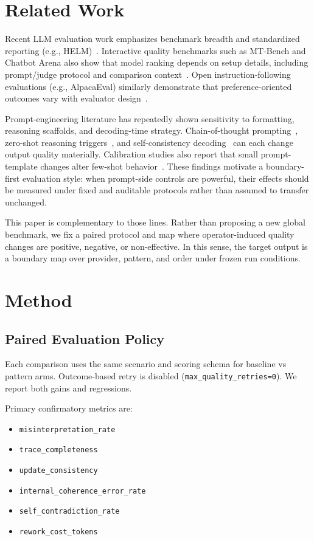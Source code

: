 \documentclass[11pt,a4paper]{article}
\begin{document}
\section{Related Work}
\label{sec:related}

Recent LLM evaluation work emphasizes benchmark breadth and standardized reporting (e.g., HELM)~\cite{liang2022helm}. Interactive quality benchmarks such as MT-Bench and Chatbot Arena also show that model ranking depends on setup details, including prompt/judge protocol and comparison context~\cite{zheng2023mtbench}. Open instruction-following evaluations (e.g., AlpacaEval) similarly demonstrate that preference-oriented outcomes vary with evaluator design~\cite{dubois2024alpacaeval}.

Prompt-engineering literature has repeatedly shown sensitivity to formatting, reasoning scaffolds, and decoding-time strategy. Chain-of-thought prompting~\cite{wei2022cot}, zero-shot reasoning triggers~\cite{kojima2022zeroshot}, and self-consistency decoding~\cite{wang2023selfconsistency} can each change output quality materially. Calibration studies also report that small prompt-template changes alter few-shot behavior~\cite{zhao2021calibrate}. These findings motivate a boundary-first evaluation style: when prompt-side controls are powerful, their effects should be measured under fixed and auditable protocols rather than assumed to transfer unchanged.

This paper is complementary to those lines. Rather than proposing a new global benchmark, we fix a paired protocol and map where operator-induced quality changes are positive, negative, or non-effective. In this sense, the target output is a boundary map over provider, pattern, and order under frozen run conditions.

\section{Method}
\label{sec:method}

\subsection{Paired Evaluation Policy}

Each comparison uses the same scenario and scoring schema for baseline vs pattern arms. Outcome-based retry is disabled (\texttt{max\_quality\_retries=0}). We report both gains and regressions.

Primary confirmatory metrics are:
\begin{itemize}
  \item \texttt{misinterpretation\_rate}
  \item \texttt{trace\_completeness}
  \item \texttt{update\_consistency}
  \item \texttt{internal\_coherence\_error\_rate}
  \item \texttt{self\_contradiction\_rate}
  \item \texttt{rework\_cost\_tokens}
\end{itemize}
\end{document}
